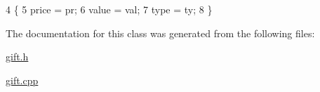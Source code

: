 \begin{DoxyCode}
4                                               \{
5     price = pr;
6     value = val;
7     type = ty;
8 \}
\end{DoxyCode}


The documentation for this class was generated from the following files\+:\begin{DoxyCompactItemize}
\item 
\hyperlink{gift_8h}{gift.\+h}\item 
\hyperlink{gift_8cpp}{gift.\+cpp}\end{DoxyCompactItemize}
